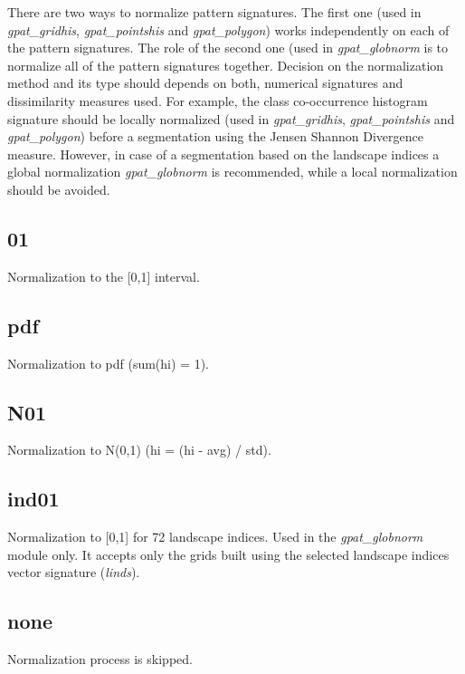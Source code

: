 There are two ways to normalize pattern signatures.
The first one (used in {\it gpat\_gridhis}, {\it gpat\_pointshis} and {\it gpat\_polygon}) works independently on each of the pattern signatures.
The role of the second one (used in {\it gpat\_globnorm} is to normalize all of the pattern signatures together. 
Decision on the normalization method and its type should depends on both, numerical signatures and dissimilarity measures used.
For example, the class co-occurrence histogram signature should be locally normalized (used in {\it gpat\_gridhis}, {\it gpat\_pointshis} and {\it gpat\_polygon}) before a segmentation using the Jensen Shannon Divergence measure.
However, in case of a segmentation based on the landscape indices a global normalization {\it gpat\_globnorm} is recommended, while a local normalization should be avoided.

\subsection{01}

Normalization to the [0,1] interval.

\subsection{pdf}

Normalization to pdf (sum(hi) = 1).

\subsection{N01}

Normalization to N(0,1) (hi = (hi - avg) / std).

\subsection{ind01}

Normalization to [0,1] for 72 landscape indices.
Used in the {\it gpat\_globnorm} module only.
It accepts only the grids built using the selected landscape indices vector signature ({\it linds}).

\subsection{none}

Normalization process is skipped. 
